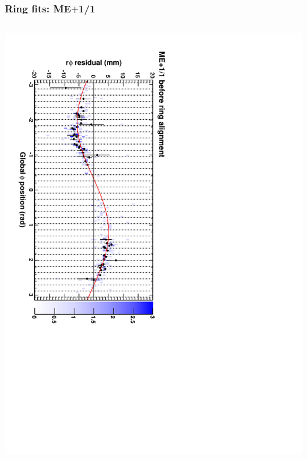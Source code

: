 \documentclass[compress]{beamer}
\begin{document}
\begin{frame}
\frametitle{Ring fits: ME$+$1/1}
\vfill
\begin{columns}
\includegraphics[height=\linewidth, angle=90]{ringfits_before/mep11.pdf}


\end{columns}
\end{frame}
\end{document}
